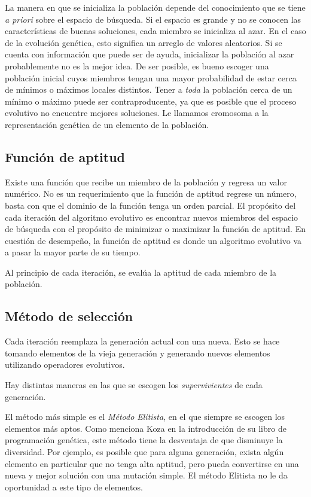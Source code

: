 La manera en que se inicializa la población depende del conocimiento que se tiene
\emph{a priori} sobre el espacio de búsqueda. Si el espacio es grande y no se
conocen las características de buenas soluciones, cada miembro se inicializa al
azar. En el caso de la evolución genética, esto significa un arreglo de valores
aleatorios. Si se cuenta con información que puede ser de ayuda, inicializar la
población al azar probablemente no es la mejor idea. De ser posible, es bueno
escoger una población inicial cuyos miembros tengan una mayor probabilidad de
estar cerca de mínimos o máximos locales distintos. Tener a \emph{toda} la
población cerca de un mínimo o máximo puede ser contraproducente, ya que es posible que el
proceso evolutivo no encuentre mejores soluciones. Le llamamos cromosoma a la
representación genética de un elemento de la población.

\subsection { Función de aptitud }

Existe una función que recibe un miembro de la población y regresa un valor
numérico.  No es un requerimiento que la función de aptitud regrese un número,
basta con que el dominio de la función tenga un orden parcial. El propósito del
cada iteración del algoritmo evolutivo es encontrar nuevos miembros del espacio
de búsqueda con el propósito de minimizar o maximizar la función de aptitud. En
cuestión de desempeño, la función de aptitud es donde un algoritmo evolutivo va
a pasar la mayor parte de su tiempo.

Al principio de cada iteración, se evalúa la aptitud de cada miembro de la población.

\subsection { Método de selección }

Cada iteración reemplaza la generación actual con una nueva. Esto se hace
tomando elementos de la vieja generación y generando nuevos elementos
utilizando operadores evolutivos.

Hay distintas maneras en las que se escogen los \emph{supervivientes} de cada
generación.

El método más simple es el \emph{Método Elitista}, en el que siempre se escogen
los elementos más aptos. Como menciona Koza \cite{koza} en la introducción de su
libro de programación genética, este método tiene la desventaja de que
disminuye la diversidad. Por ejemplo, es posible que para alguna generación,
exista algún elemento en particular que no tenga alta aptitud, pero pueda
convertirse en una nueva y mejor solución con una mutación simple. El método
Elitista no le da oportunidad a este tipo de elementos.

